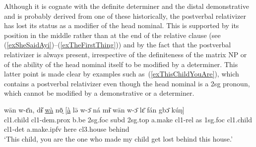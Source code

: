 \documentclass[10pt,twoside]{article}
\newcommand{\gl}[1]{`#1'}
\def\VSP{\vspace{0pt}}
\newcommand{\cl}[1]{{\sc cl#1}}
\newcommand{\pref}[1]{(\ref{#1})}
\newcommand{\rref}[2]{\pref{#1}--\pref{#2}}
\begin{document}
Although it is cognate with the definite determiner and the distal demonstrative and is probably 
derived from one of these historically, the postverbal relativizer has lost its status as a 
modifier of the head nominal. This is supported by its position in the middle rather than at 
the end of the relative clause (see \rref{exSheSaidAyi}{exTheFirstThing}) and by the 
fact that the postverbal relativizer is always present, irrespective of the definiteness of the 
matrix NP or of the ability of the head nominal itself to be modified by a determiner.
This latter point is made clear by examples such as~\pref{exThisChildYouAre}, which contains  
a postverbal relativizer even though 
the head nominal is a {\sc 2sg} pronoun, which cannot be modified by a demonstrative or a determiner. 
%
%

\begin{exe}
	\ex \label{exThisChildYouAre} 		
		\gll wān w-ɛ̄n, dɨ̌ \uline{wà} nō̤ [\uline{à} lə̄ w-ɔ̄ ná	mɨ̄ wān w-ɔ̄ lɛ̄ fán gbɔ̄ kúŋ]\\
			\cl1.child	\cl1-{\sc dem.prox} b.be	{\sc 2sg.foc}	{\sc subd} {\sc 2sg.top} a.make	\cl1-{\sc rel}	  as	{\sc 1sg.foc} \cl1.child	\cl1-{\sc det}	a.make.ipfv	here \cl3.house	behind \\
		\glt \VSP \gl{This child, you are the one who made my child get lost behind this house.}
\end{exe}%
\end{document}
